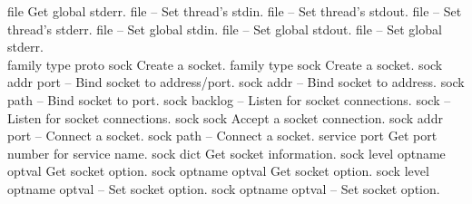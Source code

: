 \begin{longtable}{}
	{file}
	{Get global stderr.}
\hline
\optableent
	{file}
	{{\bf {}}}
	{--}
	{Set thread's stdin.}
\hline
\optableent
	{file}
	{{\bf {}}}
	{--}
	{Set thread's stdout.}
\hline
\optableent
	{file}
	{{\bf {}}}
	{--}
	{Set thread's stderr.}
\hline
\optableent
	{file}
	{{\bf {}}}
	{--}
	{Set global stdin.}
\hline
\optableent
	{file}
	{{\bf {}}}
	{--}
	{Set global stdout.}
\hline
\optableent
	{file}
	{{\bf {}}}
	{--}
	{Set global stderr.}
\hline \hline
{} \\
\hline \hline
\optableent
	{family type proto}
	{{\bf {}}}
	{sock}
	{Create a socket.}
\optableent
	{family type}
	{{\bf {}}}
	{sock}
	{Create a socket.}
\hline
\optableent
	{sock addr port}
	{{\bf {}}}
	{--}
	{Bind socket to address/port.}
\optableent
	{sock addr}
	{{\bf {}}}
	{--}
	{Bind socket to address.}
\optableent
	{sock path}
	{{\bf {}}}
	{--}
	{Bind socket to port.}
\hline
\optableent
	{sock backlog}
	{{\bf {}}}
	{--}
	{Listen for socket connections.}
\optableent
	{sock}
	{{\bf {}}}
	{--}
	{Listen for socket connections.}
\hline
\optableent
	{sock}
	{{\bf {}}}
	{sock}
	{Accept a socket connection.}
\hline
\optableent
	{sock addr port}
	{{\bf {}}}
	{--}
	{Connect a socket.}
\optableent
	{sock path}
	{{\bf {}}}
	{--}
	{Connect a socket.}
\hline
\optableent
	{service}
	{{\bf {}}}
	{port}
	{Get port number for service name.}
\hline
\optableent
	{sock}
	{{\bf {}}}
	{dict}
	{Get socket information.}
\hline
\optableent
	{sock level optname}
	{{\bf {}}}
	{optval}
	{Get socket option.}
\optableent
	{sock optname}
	{{\bf {}}}
	{optval}
	{Get socket option.}
\hline
\optableent
	{sock level optname optval}
	{{\bf {}}}
	{--}
	{Set socket option.}
\optableent
	{sock optname optval}
	{{\bf {}}}
	{--}
	{Set socket option.}

\end{longtable}
